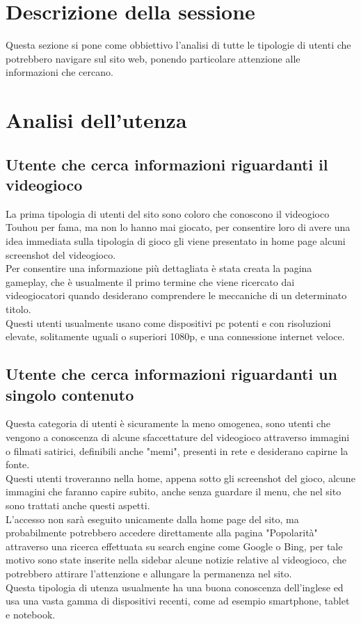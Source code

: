 \documentclass[openany, a4paper, 12pt]{report}
\begin{document}
		\section{Descrizione della sessione}
		Questa sezione si pone come obbiettivo l'analisi di tutte le tipologie di utenti che potrebbero navigare sul sito web, ponendo particolare attenzione alle informazioni che cercano.
		\section{Analisi dell'utenza}
		\subsection{Utente che cerca informazioni riguardanti il videogioco}
		La prima tipologia di utenti del sito sono coloro che conoscono il videogioco Touhou per fama, ma non lo hanno mai giocato, per consentire loro di avere una idea immediata sulla tipologia di gioco gli viene presentato in home page alcuni screenshot del videogioco.\\
		Per consentire una informazione più dettagliata è stata creata la pagina gameplay, che è usualmente il primo termine che viene ricercato dai videogiocatori quando desiderano comprendere le meccaniche di un determinato titolo.\\
		Questi utenti usualmente usano come dispositivi pc potenti e con risoluzioni elevate, solitamente uguali o superiori 1080p, e una connessione internet veloce.
		\subsection{Utente che cerca informazioni riguardanti un singolo contenuto}
		Questa categoria di utenti è sicuramente la meno omogenea, sono utenti che vengono a conoscenza di alcune sfaccettature del videogioco attraverso immagini o filmati satirici, definibili anche "memi", presenti in rete e desiderano capirne la fonte.\\
		Questi utenti troveranno nella home, appena sotto gli screenshot del gioco, alcune immagini che faranno capire subito, anche senza guardare il menu, che nel sito sono trattati anche questi aspetti.\\
		L'accesso non sarà eseguito unicamente dalla home page del sito, ma probabilmente potrebbero accedere direttamente alla pagina "Popolarità" attraverso una ricerca effettuata su search engine come Google o Bing, per tale motivo sono state inserite nella sidebar alcune notizie relative al videogioco, che potrebbero attirare l'attenzione e allungare la permanenza nel sito.\\
		Questa tipologia di utenza usualmente ha una buona conoscenza dell'inglese ed usa una vasta gamma di dispositivi recenti, come ad esempio smartphone, tablet e notebook.\\
\end{document}
